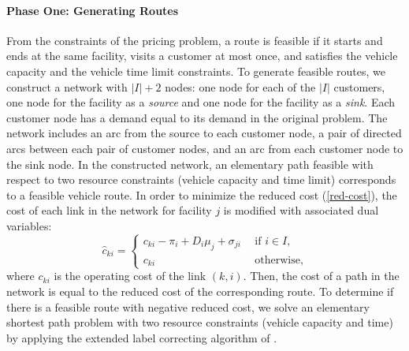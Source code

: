 \documentclass[11pt]{article}
\begin{document}
\paragraph{Phase One: Generating Routes}
From the constraints of the pricing problem, a route is feasible 
if it starts and ends at the same facility, 
visits a customer at most once, and satisfies the vehicle capacity and the
vehicle time limit constraints. 
To generate feasible routes, we construct a network with $|I| + 2$ nodes: 
one node for each of the $|I|$ customers, one node for the facility as a {\em source} and one node
for the facility as a {\em sink}.  Each customer node has a demand equal to its demand in the original
problem.  The network includes an arc from the source to each customer node, a pair of directed arcs 
between each pair of customer nodes, and an arc from each customer node to the sink node. 
In the constructed network, an elementary path  feasible with respect to 
two resource constraints (vehicle capacity and time limit) corresponds to a feasible vehicle route.  
In order to minimize the reduced cost (\ref{red-cost}), the cost of each link in the network
for facility $j$ is modified with associated dual variables: 
\begin{equation}
\hat{c}_{ki}   =  \left \{ \begin{array}{ll}
                 c_{ki} - \pi_i + D_{i} \mu_{j}+\sigma_{ji} \ \ & \mbox{if $i \in I$,}\\
                 c_{ki}  & \mbox{otherwise,}                                                  
                \end{array}
       \right. 
\end{equation}
where $c_{ki}$ is the operating cost of the link $(k, i)$.  
Then, the cost of a path in the network is equal to the reduced cost of the corresponding route.
To determine if there is a feasible route with negative reduced cost, we solve an elementary shortest path
problem with two resource constraints (vehicle capacity and time) by applying the
extended label correcting algorithm of \citet{Feillet}.
\end{document}
